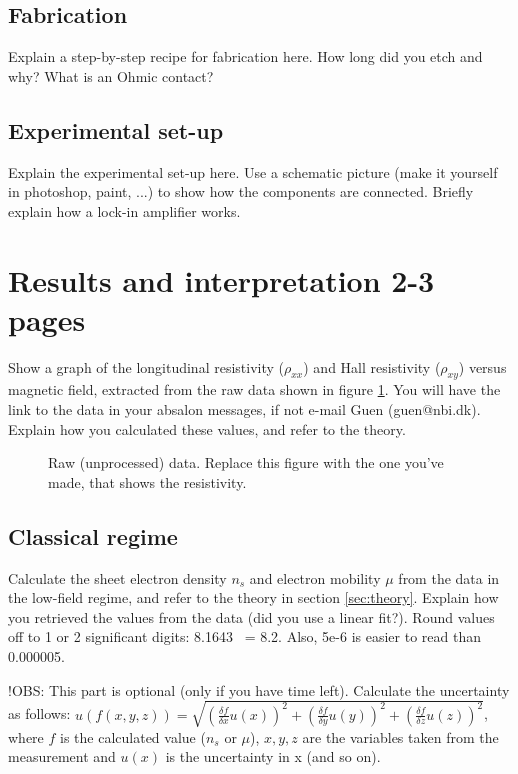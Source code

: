 \documentclass[a4paper]{article}
\begin{document}
      \subsection{Fabrication}
      Explain a step-by-step recipe for fabrication here. How long did you etch and why? What is an Ohmic contact?
      \subsection{Experimental set-up}
      Explain the experimental set-up here. Use a schematic picture (make it yourself in photoshop, paint, ...) to show how the components are connected. Briefly explain how a lock-in amplifier works.
      
      \section{Results and interpretation 2-3 pages}
      Show a graph of the longitudinal resistivity ($\rho_{xx}$) and Hall resistivity ($\rho_{xy}$) versus magnetic field, extracted from the raw data shown in figure \ref{fig:data}. You will have the link to the data in your absalon messages, if not e-mail Guen (guen@nbi.dk). Explain how you calculated these values, and refer to the theory.
      
      \begin{figure}
      \centering
      \caption{\label{fig:data}Raw (unprocessed) data. Replace this figure with the one you've made, that shows the resistivity.}
      \end{figure}
      
      \subsection{Classical regime}
      Calculate the sheet electron density $n_{s}$ and electron mobility $\mu$ from the data in the low-field regime, and refer to the theory in section \ref{sec:theory}. Explain how you retrieved the values from the data (did you use a linear fit?).
      Round values off to 1 or 2 significant digits: 8.1643 ~= 8.2. Also, 5e-6 is easier to read than 0.000005.
      
      !OBS: This part is optional (only if you have time left).
      Calculate the uncertainty as follows: \newline $u(f(x, y, z)) = \sqrt{(\frac{\delta f}{\delta{x}} u(x))^{2} + (\frac{\delta f}{\delta{y}} u(y))^{2} + (\frac{\delta f}{\delta{z}} u(z))^{2}}$, where $f$ is the calculated value ($n_{s}$ or $\mu$), $x, y, z$ are the variables taken from the measurement and $u(x)$ is the uncertainty in x (and so on).
      
\end{document}
